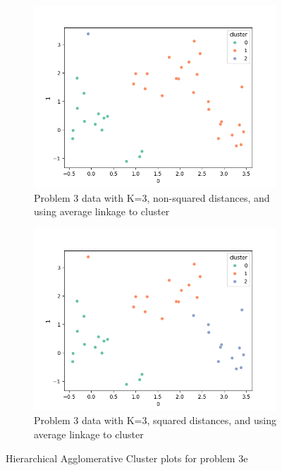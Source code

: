 \documentclass[12pt]{article}
\begin{document}
\begin{figure}
    \begin{subfigure}{0.5\textwidth}
        \centering
        \includegraphics[width=\linewidth]{../plots/average_linkage_3.png}
        \caption{Problem 3 data with K=3, non-squared distances, and using average linkage to cluster}
        \label{fig:average_3}
    \end{subfigure}
    \begin{subfigure}{0.5\textwidth}
        \centering
        \includegraphics[width=\linewidth]{../plots/average_squared_3.png}
        \caption{Problem 3 data with K=3, squared distances, and using average linkage to cluster}
        \label{fig:average_squared_3}
    \end{subfigure}
    \caption{Hierarchical Agglomerative Cluster plots for problem 3e}
\end{figure}
\end{document}
